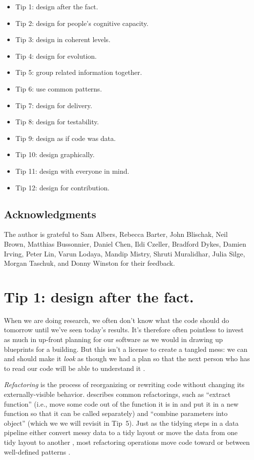 \documentclass[10pt,letterpaper]{article}
\begin{document}
\begin{itemize}
  \itemsep0em
  \item[] Tip 1: design after the fact.
  \item[] Tip 2: design for people's cognitive capacity.
  \item[] Tip 3: design in coherent levels.
  \item[] Tip 4: design for evolution.
  \item[] Tip 5: group related information together.
  \item[] Tip 6: use common patterns.
  \item[] Tip 7: design for delivery.
  \item[] Tip 8: design for testability.
  \item[] Tip 9: design as if code was data.
  \item[] Tip 10: design graphically.
  \item[] Tip 11: design with everyone in mind.
  \item[] Tip 12: design for contribution.
\end{itemize}

\subsection*{Acknowledgments}

The author is grateful to Sam Albers,
Rebecca Barter,
John Blischak,
Neil Brown,
Matthias Bussonnier,
Daniel Chen,
Ildi Czeller,
Bradford Dykes,
Damien Irving,
Peter Lin,
Varun Lodaya,
Mandip Mistry,
Shruti Muralidhar,
Julia Silge,
Morgan Taschuk,
and Donny Winston
for their feedback.

\section*{Tip 1: design after the fact.}

When we are doing research,
we often don't know what the code should do tomorrow
until we've seen today's results.
It's therefore often pointless to invest as much in up-front planning for our software
as we would in drawing up blueprints for a building.
But this isn't a license to create a tangled mess:
we can and should make it \emph{look} as though we had a plan
so that the next person who has to read our code will be able to understand it \cite{Parnas1986}.

\emph{Refactoring} is the process of reorganizing or rewriting code
without changing its externally-visible behavior.
\cite{Fowler2018} describes common refactorings,
such as ``extract function''
(i.e., move some code out of the function it is in
and put it in a new function so that it can be called separately)
and ``combine parameters into object''
(which we we will revisit in Tip~5).
Just as the tidying steps in a data pipeline
either convert messy data to a tidy layout or move the data from one tidy layout to another \cite{Wickham2017},
most refactoring operations move code toward or between well-defined patterns \cite{Kerievsky2004}.
\end{document}
